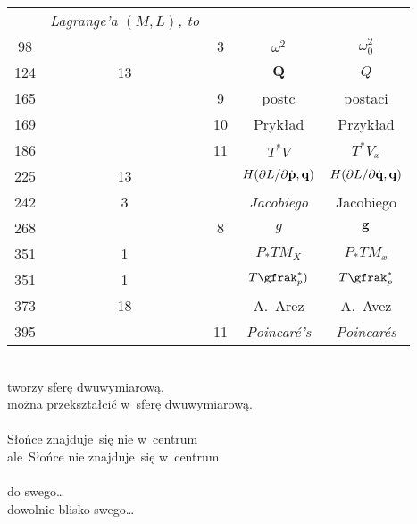\documentclass[a4paper,11pt]{article}
\begin{document}
\begin{center}
\begin{tabular}{|c|c|c|c|c|}
           & \textit{Lagrange'a $( M, L )$, to} \\
    98  & &  3 & $\omega^{ 2 }$ & $\omega_{ 0 }^{ 2 }$ \\
    124 & 13 & & $\mathbf{Q}$ & $Q$ \\
    165 & &  9 & postc & postaci \\
    169 & & 10 & Prykład & Przykład \\
    186 & & 11 & $T^{ * } V$ & $T^{ * } V_{ x }$ \\
    225 & 13 & & $H( \partial L / \partial \dot{ \mathbf{p} }, \mathbf{q} )$
           & $H( \partial L / \partial \dot{ \mathbf{q} }, \mathbf{q} )$ \\
    242 &  3 & & \textit{Jacobiego} & Jacobiego \\
    268 & &  8 & $g$ & $\mathbf{g}$ \\
    351 &  1 & & $P_{ * }TM_{ X }$ & $P_{ * }TM_{ x }$ \\
    351 &  1 & & $T\gfrak_{ p }^{ * })$ & $T\gfrak_{ p }^{ * }$ \\
    373 & 18 & & A.~Arez & A.~Avez \\
    395 & & 11 & \textit{Poincar\'{e}'s} & \textit{Poincar\'{e}s} \\
    \hline
  \end{tabular}

\end{center}


\noindent
{} \\
\Jest  tworzy sferę dwuwymiarową. \\
\Powin można przekształcić w~sferę dwuwymiarową. \\
 \\
\Jest  Słońce znajduje~się nie w~centrum \\
\Powin ale~Słońce nie znajduje~się w~centrum \\
 \\
\Jest  do swego\ldots \\
\Powin dowolnie blisko swego\ldots \\


\vspace{\spaceTwo}
\end{document}
